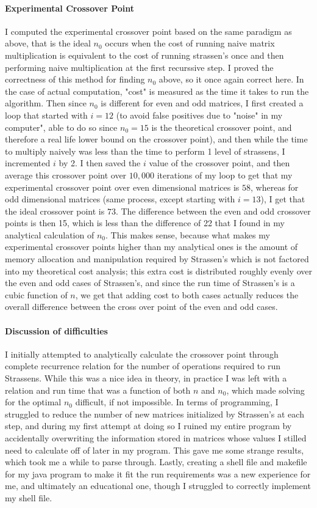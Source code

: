 \documentclass[10pt,letter]{article}
\begin{document}
\paragraph{Experimental Crossover Point} I computed the experimental crossover point based on the same paradigm as above, that is the ideal $n_0$ occurs when the cost of running naive matrix multiplication is equivalent to the cost of running strassen's once and then performing naive multiplication at the first recurssive step. I proved the correctness of this method for finding $n_0$ above, so it once again correct here. In the case of actual computation, "cost" is measured as the time it takes to run the algorithm. Then since $n_0$ is different for even and odd matrices, I first created a loop that started with $i = 12$ (to avoid false positives due to "noise" in my computer", able to do so since $n_0 = 15$ is the theoretical crossover point, and therefore a real life lower bound on the crossover point), and then while the time to multiply naively was less than the time to perform 1 level of strassens, I incremented $i$ by 2. I then saved the $i$ value of the crossover point, and then average this crossover point over $10,000$ iterations of my loop to get that my experimental crossover point over even dimensional matrices is $\boxed{58}$, whereas for odd dimensional matrices (same process, except starting with $i=13$), I get that the ideal crossover point is $\boxed{73}$. The difference between the even and odd crossover points is then 15, which is less than the difference of 22 that I found in my analytical calculation of $n_0$. This makes sense, because what makes my experimental crossover points higher than my analytical ones is the amount of memory allocation and manipulation required by Strassen's which is not factored into my theoretical cost analysis; this extra cost is distributed roughly evenly over the even and odd cases of Strassen's, and since the run time of Strassen's is a cubic function of $n$, we get that adding cost to both cases actually reduces the overall difference between the cross over point of the even and odd cases.


\paragraph{Discussion of difficulties} I initially attempted to analytically calculate the crossover point through complete recurrence relation for the number of operations required to run Strassens. While this was a nice idea in theory, in practice I was left with a relation and run time that was a function of both $n$ and $n_0$, which made solving for the optimal $n_0$ difficult, if not impossible. In terms of programming, I struggled to reduce the number of new matrices initialized by Strassen's at each step, and during my first attempt at doing so I ruined my entire program by accidentally overwriting the information stored in matrices whose values I stilled need to calculate off of later in my program. This gave me some strange results, which took me a while to parse through. Lastly, creating a shell file and makefile for my java program to make it fit the run requirements was a new experience for me, and ultimately an educational one, though I struggled to correctly implement my shell file.
\end{document}

